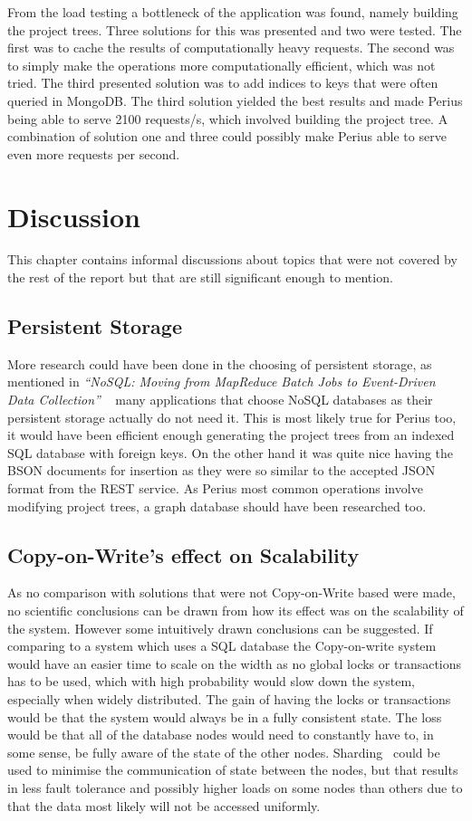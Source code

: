 \documentclass[a4paper,12pt]{article}
\begin{document}
\par From the load testing a bottleneck of the application was found, namely building the project
trees. Three solutions for this was presented and two were tested. The first was to cache the
results of computationally heavy requests. The second was to simply make the operations more
computationally efficient, which was not tried. The third presented solution was to add indices to
keys that were often queried in MongoDB. The third solution yielded the best results and made Perius
being able to serve 2100 requests/s, which involved building the project tree. A combination of
solution one and three could possibly make Perius able to serve even more requests per second.

\restoregeometry
\newpage
\section{Discussion}
This chapter contains informal discussions about topics that were not covered by the rest of the
report but that are still significant enough to mention.

\subsection{Persistent Storage}
More research could have been done in the choosing of persistent storage, as mentioned in 
\textit{``NoSQL: Moving from MapReduce Batch Jobs to Event-Driven Data Collection''}
~\cite{KLINGSBO} many applications that choose NoSQL databases as their persistent storage 
actually do not need it. This is most likely true for Perius too, it would have been efficient 
enough generating the project trees from an indexed SQL database with foreign keys. On the 
other hand it was quite nice having the BSON documents for insertion as they were so similar 
to the accepted JSON format from the REST service. As Perius most common operations involve 
modifying project trees, a graph database should have been researched too.

\subsection{Copy-on-Write's effect on Scalability}
As no comparison with solutions that were not Copy-on-Write based were made, no scientific
conclusions can be drawn from how its effect was on the scalability of the system. However some
intuitively drawn conclusions can be suggested. If comparing to a system which uses a SQL database
the Copy-on-write system would have an easier time to scale on the width as no global locks or
transactions has to be used, which with high probability would slow down the system, especially when
widely distributed.
The gain of having the locks or transactions would be that the system would
always be in a fully consistent state. The loss would be that all of the database nodes would need
to constantly have to, in some sense, be fully aware of the state of the other nodes.
Sharding~\cite{SHARDING} could be used to minimise the communication of state between the nodes, but
that results in less fault tolerance and possibly higher loads on some nodes than others due to that
the data most likely will not be accessed uniformly.
\end{document}
